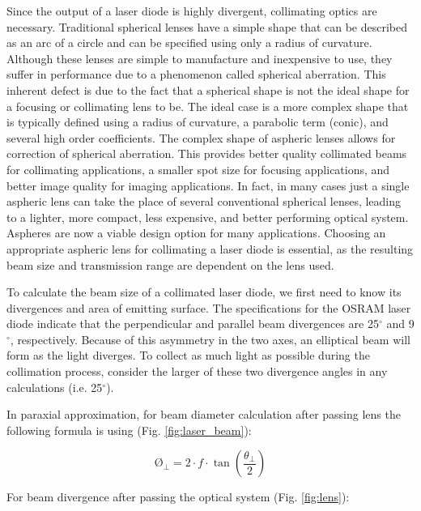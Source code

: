 Since the output of a laser diode is highly divergent, collimating optics are necessary. 
Traditional spherical lenses have a simple shape that can be
described as an arc of a circle and can be specified using
only a radius of curvature. Although these lenses are simple
to manufacture and inexpensive to use, they suffer in
performance due to a phenomenon called spherical
aberration. This inherent defect is due to the fact that a
spherical shape is not the ideal shape for a focusing or
collimating lens to be. The ideal case is a more complex
shape that is typically defined using a radius of curvature, a
parabolic term (conic), and several high order coefficients.
The complex shape of aspheric lenses allows for correction
of spherical aberration. This provides better quality
collimated beams for collimating applications, a smaller spot
size for focusing applications, and better image quality for
imaging applications. In fact, in many cases just a single
aspheric lens can take the place of several conventional
spherical lenses, leading to a lighter, more compact, less
expensive, and better performing optical system. Aspheres
are now a viable design option for many applications.
Choosing an appropriate aspheric lens for collimating a laser diode is essential, as the resulting beam size and transmission range are dependent on the lens used.

To calculate the beam size of a collimated laser diode, we first need to know its divergences and area of emitting surface.
The specifications for the OSRAM laser diode indicate that the perpendicular and parallel beam divergences are 25${^\circ}$ and 9${^\circ}$, respectively. Because of this asymmetry in the two axes, an elliptical beam will form as the light diverges. To collect as much light as possible during the collimation process, consider the larger of these two divergence angles in any calculations (i.e. 25${^\circ}$).

In paraxial approximation, for beam diameter calculation after passing lens  the following formula is using (Fig. \ref{fig:laser_beam}):

\begin{equation}\label{eq:beam_size}
\text{\O}_{\perp} = 2 \cdot f \cdot \tan{(\frac{\theta_{\perp}}{2})}
\end{equation}

For beam divergence after passing the optical system (Fig. \ref{fig:lens}):



